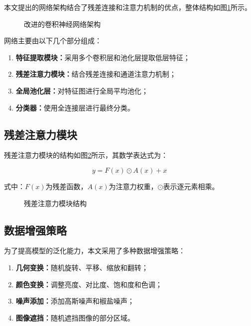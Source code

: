 \documentclass[a4paper,12pt]{article}
\begin{document}
本文提出的网络架构结合了残差连接和注意力机制的优点，整体结构如图\ref{fig:network}所示。

\begin{figure}[htbp]
\centering
\caption{改进的卷积神经网络架构}
\label{fig:network}
\end{figure}

网络主要由以下几个部分组成：
\begin{enumerate}
    \item \textbf{特征提取模块：}采用多个卷积层和池化层提取低层特征；
    \item \textbf{残差注意力模块：}结合残差连接和通道注意力机制；
    \item \textbf{全局池化层：}对特征图进行全局平均池化；
    \item \textbf{分类器：}使用全连接层进行最终分类。
\end{enumerate}

\subsection{残差注意力模块}

残差注意力模块的结构如图\ref{fig:attention_block}所示，其数学表达式为：

\begin{equation}
y = F(x) \odot A(x) + x
\label{eq:residual_attention}
\end{equation}

式中：$F(x)$为残差函数，$A(x)$为注意力权重，$\odot$表示逐元素相乘。

\begin{figure}[htbp]
\centering
\caption{残差注意力模块结构}
\label{fig:attention_block}
\end{figure}

\subsection{数据增强策略}

为了提高模型的泛化能力，本文采用了多种数据增强策略：

\begin{enumerate}
    \item \textbf{几何变换：}随机旋转、平移、缩放和翻转；
    \item \textbf{颜色变换：}调整亮度、对比度、饱和度和色调；
    \item \textbf{噪声添加：}添加高斯噪声和椒盐噪声；
    \item \textbf{图像遮挡：}随机遮挡图像的部分区域。
\end{enumerate}
\end{document}
